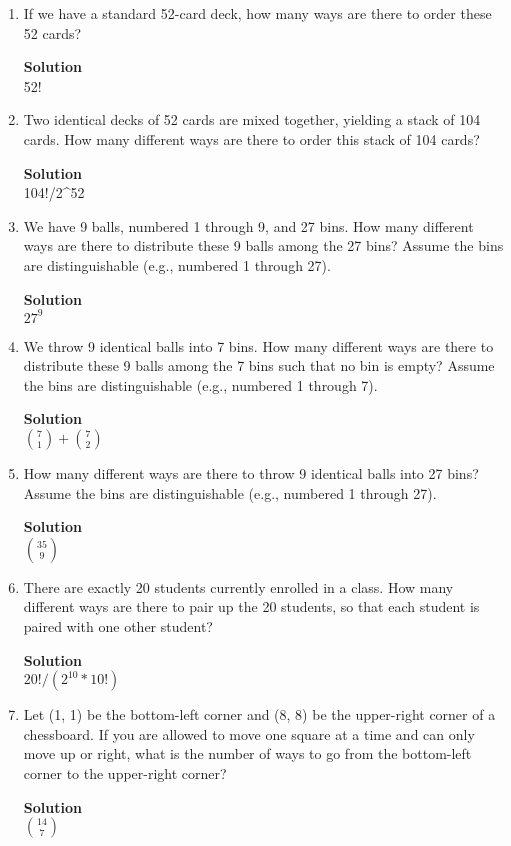\documentclass[11pt]{article}
\newenvironment{Parts}{\begin{enumerate}[label=(\alph*)]}{\end{enumerate}}
\newcommand*{\Part}{\item}
\begin{document}
\begin{Parts}
\Part If we have a standard 52-card deck, how many ways are there to
  order these 52 cards?
\begin{mdframed} \textbf{Solution} \\
52!
\end{mdframed}

\Part Two identical decks of 52 cards are mixed together, yielding a
  stack of 104 cards.
  How many different ways are there to order this stack of 104 cards?
\begin{mdframed} \textbf{Solution} \\
104!/2^{52}
\end{mdframed}

\Part We have 9 balls, numbered 1 through 9, and 27 bins.
  How many different ways are there to distribute these 9 balls among
  the 27 bins? Assume the bins are distinguishable (e.g., numbered 1
  through 27).
\begin{mdframed} \textbf{Solution} \\
$27^9$
\end{mdframed}

\Part We throw 9 identical balls into 7 bins.
  How many different ways are there to distribute these 9 balls among
  the 7 bins such that no bin is empty? Assume the bins are
  distinguishable (e.g., numbered 1 through 7).
\begin{mdframed} \textbf{Solution} \\
$\binom{7}{1} + \binom{7}{2}$
\end{mdframed}

\Part How many different ways are there to throw 9 identical balls
  into 27 bins? Assume the bins are distinguishable (e.g., numbered 1
  through 27).
\begin{mdframed} \textbf{Solution} \\
$\binom{35}{9}$
\end{mdframed}

\Part There are exactly 20 students currently enrolled in a class.
  How many different ways are there to pair up the 20 students, so
  that each student is paired with one other student?
\begin{mdframed} \textbf{Solution} \\
$20!/(2^{10}*10!)$
\end{mdframed}

\Part Let (1, 1) be the bottom-left corner and (8, 8) be the upper-right 
corner of a chessboard. If you are allowed to move one square at a time and
can only move up or right, what is the number of ways to go from the bottom-left corner to 
the upper-right corner? 
\begin{mdframed} \textbf{Solution} \\
$\binom{14}{7}$
\end{mdframed}


\end{Parts}
\end{document}
